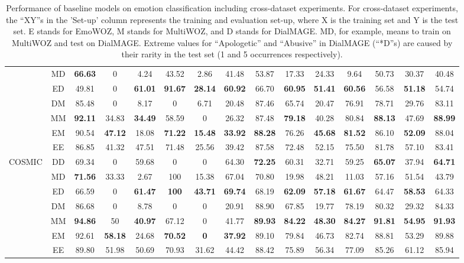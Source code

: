 \documentclass[10pt, a4paper]{article}
\begin{document}
\begin{table}[ht!]
\begin{tabular}{l|c|ccccccc|ccc|ccc}
 & MD & \textbf{66.63} & 0 & 4.24 & 43.52 & 2.86 & 41.48 & 53.87 & 17.33 & 24.33 & 9.64 & 50.73 & 30.37 & 40.48 \\
 & ED & 49.81 & 0 & \textbf{61.01} & \textbf{91.67} & \textbf{28.14} & \textbf{60.92} & 66.70 & \textbf{60.95} & \textbf{51.41} & \textbf{60.56} & 56.58 & \textbf{51.18} & 54.74 \\ \cline{2-15}
 & DM & 85.48 & 0 & 8.17 & 0 & 6.71 & 20.48 & 87.46 & 65.74 & 20.47 & 76.91 & 78.71 & 29.76 & 83.11 \\
 & MM & \textbf{92.11} & 34.83 & \textbf{34.49} & 58.59 & 0 & 26.32 & 87.48 & \textbf{79.18} & 40.28 & 80.84 & \textbf{88.13} & 47.69 & \textbf{88.99} \\
 & EM & 90.54 & \textbf{47.12} & 18.08 & \textbf{71.22} & \textbf{15.48} & \textbf{33.92} & \textbf{88.28} & 76.26 & \textbf{45.68} & \textbf{81.52} & 86.10 & \textbf{52.09} & 88.04 \\ \cline{2-15}
 & EE & 86.85 & 41.32 & 47.51 & 71.48 & 25.56 & 39.42 & 87.58 & 72.48 & 52.15 & 75.50 & 81.78 & 57.10 & 83.41 \\ \hline \hline
\multirow{7}{*}{COSMIC} & DD & 69.34 & 0 & 59.68 & 0 & 0 & 64.30 & \textbf{72.25} & 60.31 & 32.71 & 59.25 & \textbf{65.07} & 37.94 & \textbf{64.71} \\
 & MD & \textbf{71.56} & 33.33 & 2.67 & 100 & 15.38 & 67.04 & 70.80 & 19.98 & 48.21 & 11.03 & 57.16 & 51.54 & 43.79 \\
 & ED & 66.59 & 0 & \textbf{61.47} & \textbf{100} & \textbf{43.71} & \textbf{69.74} & 68.19 & \textbf{62.09} & \textbf{57.18} & \textbf{61.67} & 64.47 & \textbf{58.53} & 64.33 \\ \cline{2-15}
 & DM & 86.68 & 0 & 8.78 & 0 & 0 & 20.91 & 88.90 & 67.85 & 19.77 & 78.19 & 80.32 & 29.32 & 84.33 \\
 & MM & \textbf{94.86} & 50 & \textbf{40.97} & 67.12 & 0 & 41.77 & \textbf{89.93} & \textbf{84.22} & \textbf{48.30} & \textbf{84.27} & \textbf{91.81} & \textbf{54.95} & \textbf{91.93} \\
 & EM & 92.61 & \textbf{58.18} & 24.68 & \textbf{70.52} & \textbf{0} & \textbf{37.92} & 89.10 & 79.84 & 46.73 & 82.74 & 88.81 & 53.29 & 89.88 \\ \cline{2-15}
 & EE & 89.80 & 51.98 & 50.69 & 70.93 & 31.62 & 44.42 & 88.42 & 75.89 & 56.34 & 77.09 & 85.26 & 61.12 & 85.94 \\
 \bottomrule[1pt]
\end{tabular}
    \caption{Performance of baseline models on emotion classification including cross-dataset experiments. For cross-dataset experiments, the ``XY''s in the 'Set-up' column represents the training and evaluation set-up, where X is the training set and Y is the test set. E stands for EmoWOZ, M stands for MultiWOZ, and D stands for DialMAGE. MD, for example, means to train on MultiWOZ and test on DialMAGE. Extreme values for ``Apologetic'' and ``Abusive'' in DialMAGE (``*D''s) are caused by their rarity in the test set (1 and 5 occurrences respectively).}
    \label{tab:f1-cross-emotion}
\end{table}
\end{document}

